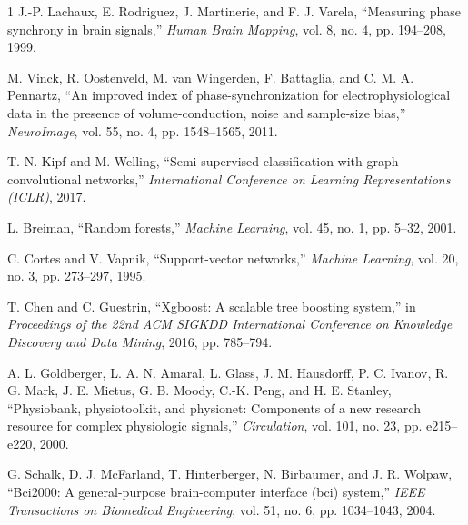 \documentclass[conference]{IEEEtran}
\begin{document}
\begin{thebibliography}{1}
J.-P. Lachaux, E. Rodriguez, J. Martinerie, and F. J. Varela, ``Measuring phase synchrony in brain signals,'' \emph{Human Brain Mapping}, vol. 8, no. 4, pp. 194--208, 1999.

M. Vinck, R. Oostenveld, M. van Wingerden, F. Battaglia, and C. M. A. Pennartz, ``An improved index of phase-synchronization for electrophysiological data in the presence of volume-conduction, noise and sample-size bias,'' \emph{NeuroImage}, vol. 55, no. 4, pp. 1548--1565, 2011.

T. N. Kipf and M. Welling, ``Semi-supervised classification with graph convolutional networks,'' \emph{International Conference on Learning Representations (ICLR)}, 2017.

L. Breiman, ``Random forests,'' \emph{Machine Learning}, vol. 45, no. 1, pp. 5--32, 2001.

C. Cortes and V. Vapnik, ``Support-vector networks,'' \emph{Machine Learning}, vol. 20, no. 3, pp. 273--297, 1995.

T. Chen and C. Guestrin, ``Xgboost: A scalable tree boosting system,'' in \emph{Proceedings of the 22nd ACM SIGKDD International Conference on Knowledge Discovery and Data Mining}, 2016, pp. 785--794.

A. L. Goldberger, L. A. N. Amaral, L. Glass, J. M. Hausdorff, P. C. Ivanov, R. G. Mark, J. E. Mietus, G. B. Moody, C.-K. Peng, and H. E. Stanley, ``Physiobank, physiotoolkit, and physionet: Components of a new research resource for complex physiologic signals,'' \emph{Circulation}, vol. 101, no. 23, pp. e215--e220, 2000.

G. Schalk, D. J. McFarland, T. Hinterberger, N. Birbaumer, and J. R. Wolpaw, ``Bci2000: A general-purpose brain-computer interface (bci) system,'' \emph{IEEE Transactions on Biomedical Engineering}, vol. 51, no. 6, pp. 1034--1043, 2004.
\end{thebibliography}
\end{document}

